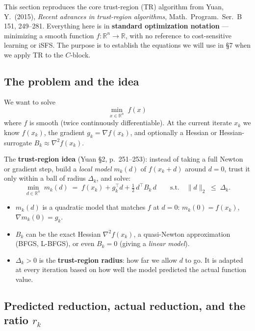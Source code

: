 \documentclass[11pt,a4paper]{article}
\begin{document}
This section reproduces the core trust-region (TR) algorithm from Yuan, Y.\ (2015), \emph{Recent advances in trust-region algorithms}, Math.\ Program.\ Ser.\ B 151, 249--281. Everything here is in \textbf{standard optimization notation} --- minimizing a smooth function $f : \mathbb{R}^n \to \mathbb{R}$, with no reference to cost-sensitive learning or iSFS. The purpose is to establish the equations we will use in \S 7 when we apply TR to the $C$-block.

\subsection{The problem and the idea}

We want to solve
\[
\min_{x \in \mathbb{R}^n}\; f(x)
\]
where $f$ is smooth (twice continuously differentiable). At the current iterate $x_k$ we know $f(x_k)$, the gradient $g_k = \nabla f(x_k)$, and optionally a Hessian or Hessian-surrogate $B_k \approx \nabla^2 f(x_k)$.

The \textbf{trust-region idea} (Yuan \S 2, p.\ 251--253): instead of taking a full Newton or gradient step, build a \emph{local model} $m_k(d)$ of $f(x_k + d)$ around $d = 0$, trust it only within a ball of radius $\Delta_k$, and solve:
\begin{equation}
\boxed{\;
\min_{d \in \mathbb{R}^n}\; m_k(d) \;=\; f(x_k) + g_k^\top d + \tfrac12\,d^\top B_k\,d
\qquad\text{s.t.}\quad \|d\|_2 \;\le\; \Delta_k.
\;}
\tag{Yuan, eq.\ 2.3--2.4}
\end{equation}

\begin{itemize}[leftmargin=*,itemsep=2pt]
  \item $m_k(d)$ is a quadratic model that matches $f$ at $d = 0$: $m_k(0) = f(x_k)$, $\nabla m_k(0) = g_k$.
  \item $B_k$ can be the exact Hessian $\nabla^2 f(x_k)$, a quasi-Newton approximation (BFGS, L-BFGS), or even $B_k = 0$ (giving a \emph{linear model}).
  \item $\Delta_k > 0$ is the \textbf{trust-region radius}: how far we allow $d$ to go. It is adapted at every iteration based on how well the model predicted the actual function value.
\end{itemize}

\subsection{Predicted reduction, actual reduction, and the ratio $r_k$}
\end{document}
